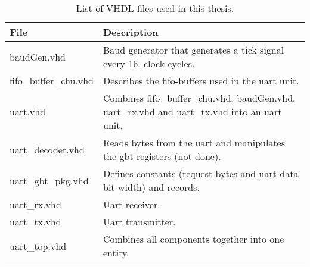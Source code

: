 \documentclass[main.tex]{subfiles}
\begin{document}
\begin{table}[H]
\centering

\begin{tabular}{l p{8cm}}
\hline
 File & Description \\ \hline
 baudGen.vhd & Baud generator that generates a tick signal every 16. clock cycles. \\ %
 fifo\_buffer\_chu.vhd & Describes the fifo-buffers used in the uart unit. \\
 uart.vhd & Combines fifo\_buffer\_chu.vhd, baudGen.vhd, uart\_rx.vhd and uart\_tx.vhd into an uart unit. \\ %
 uart\_decoder.vhd & Reads bytes from the uart and manipulates the gbt registers (not done).\\ %
 uart\_gbt\_pkg.vhd & Defines constants (request-bytes and uart data bit width) and records. \\ %
 uart\_rx.vhd & Uart receiver. \\ %
 uart\_tx.vhd & Uart transmitter. \\ %
 uart\_top.vhd & Combines all components together into one entity. \\ \hline
\end{tabular}
\label{tab:vhdcode}
\caption{List of VHDL files used in this thesis.}
\end{table}
\end{document}
